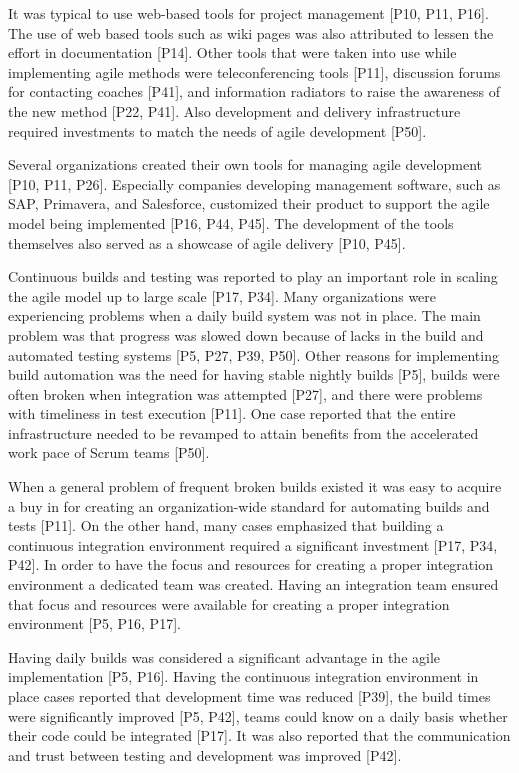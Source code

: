 \documentclass[preprint,authoryear,12pt]{elsarticle}
\begin{document}
It was typical to use web-based tools for project management [P10, P11, P16].
The use of web based tools such as wiki pages was also attributed to lessen the
effort in documentation [P14]. Other tools that were taken into use while
implementing agile methods were teleconferencing tools [P11], discussion forums
for contacting coaches [P41], and information radiators to raise the awareness
of the new method [P22, P41]. Also development and delivery infrastructure
required investments to match the needs of agile development [P50]. 

Several organizations created their own tools for managing agile development
[P10, P11, P26]. Especially companies developing management software, such as
SAP, Primavera, and Salesforce, customized their product to support the agile
model being implemented [P16, P44, P45]. The development of the tools themselves
also served as a showcase of agile delivery [P10, P45].


Continuous builds and testing was reported to play an important role in scaling
the agile model up to large scale [P17, P34]. Many organizations were
experiencing problems when a daily build system was not in place. The main
problem was that progress was slowed down because of lacks in the build and
automated testing systems [P5, P27, P39, P50].
Other reasons for implementing build automation was the need for having stable
nightly builds [P5], builds were often broken when integration was attempted
[P27], and there were problems with timeliness in test execution [P11]. One case
reported that the entire infrastructure needed to be revamped to attain benefits
from the accelerated work pace of Scrum teams [P50].

When a general problem of frequent broken builds existed it was easy to acquire
a buy in for creating an organization-wide standard for automating builds and
tests [P11]. On the other hand, many cases emphasized that building a continuous
integration environment required a significant investment [P17, P34, P42].
In order to have the focus and resources for creating a proper integration
environment a dedicated team was created. Having an integration team ensured
that focus and resources were available for creating a proper integration
environment [P5, P16, P17].

Having daily builds was considered a significant advantage in the agile
implementation [P5, P16]. Having the continuous integration environment in place
cases reported that development time was reduced [P39], the build times were
significantly improved [P5, P42], teams could know on a daily basis whether
their code could be integrated [P17]. It was also reported that the
communication and trust between testing and development was improved [P42].
\end{document}
